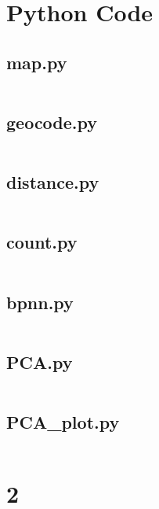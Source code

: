 \documentclass{mcmthesis}
\begin{document}
\begin{appendices}

\section{Python Code}

\subsection{map.py}\label{code:map}
\inputminted{python}{../src/map.py}

\subsection{geocode.py}\label{code:geocode}
\inputminted{python}{../src/geocode.py}

\subsection{distance.py}\label{code:distance}
\inputminted{python}{../src/distance.py}

\subsection{count.py} \label{code:count}
\inputminted{python}{../src/count.py}

\subsection{bpnn.py} \label{code:bpnn}
\inputminted{python}{../src/bpnn.py}

\subsection{PCA.py} \label{code:PCA}
\inputminted{python}{../src/PCA.py}

\subsection{PCA\_plot.py} \label{code:PCA_plot}
\inputminted{python}{../src/PCA_plot.py}

\section{2}

\end{appendices}
\end{document}
